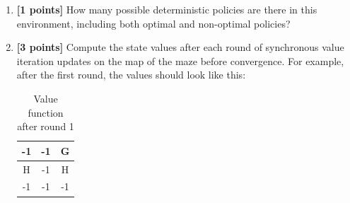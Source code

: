 \begin{enumerate}
\item \textbf{[1 points]} How many possible deterministic policies are there in this environment, including both optimal and non-optimal policies?

\begin{tcolorbox}[fit,height=3cm, width=\linewidth, blank, borderline={1pt}{-2pt},nobeforeafter]
\end{tcolorbox}


\newpage

\item \textbf{[3 points]} Compute the state values after each round of synchronous value iteration updates on the map of the maze before convergence. For example, after the first round, the values should look like this:

\begin{table}[H]
\begin{center}
  \begin{tabular}{ | c | c | c | }
    \hline
    -1 & -1 & G\\ \hline
    H & -1 & H \\ \hline
    -1 & -1 & -1 \\ \hline
  \end{tabular}
 \caption{Value function after round 1}
\end{center}
\end{table}

\begin{tcolorbox}[fit,height=3.5cm, width=\linewidth, blank, borderline={1pt}{-2pt},nobeforeafter]
    \def\arraystretch{1.5}
    

\end{tcolorbox}
\end{enumerate}
